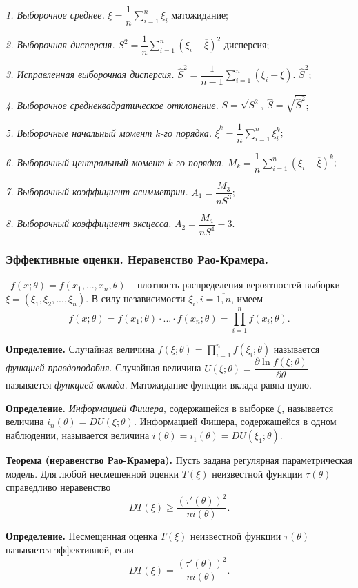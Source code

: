 \documentclass[9pt]{article}
\begin{document}
\ 
\par\textit{1. Выборочное среднее.} \(\overline\xi=\dfrac{1}{n}\displaystyle\sum_{i=1}^n\xi_i\) матожидание;
\par\textit{2. Выборочная дисперсия.} \(S^2=\dfrac{1}{n}\displaystyle\sum_{i=1}^n(\xi_i-\overline\xi)^2\) дисперсия;
\par\textit{3. Исправленная выборочная дисперсия.} \(\hat S^2=\dfrac{1}{n - 1}\displaystyle\sum_{i=1}^n(\xi_i-\overline\xi)\). \(\hat S^2\);
\par\textit{4. Выборочное среднеквадратическое отклонение.} \(S=\sqrt{S^2},\ \hat S=\sqrt{\hat S^2}\);
\par\textit{5. Выборочные начальный момент \(k\)-го порядка.} \(\overline\xi^k=\dfrac{1}{n}\displaystyle\sum_{i=1}^n\xi^k_i\);
\par\textit{6. Выборочный центральный момент \(k\)-го порядка.} \(M_k=\dfrac{1}{n}\displaystyle\sum_{i=1}^n(\xi_i-\overline{\xi})^k\);
\par\textit{7. Выборочный коэффициент асимметрии.} \(A_1=\dfrac{M_3}{nS^3}\);
\par\textit{8. Выборочный коэффициент эксцесса.} \(A_2=\dfrac{M_4}{nS^4}-3\).

\subsubsection{Эффективные оценки. Неравенство Рао-Крамера.}

\ 
 \(f(x;\theta)=f(x_1,...,x_n,\theta)\) -- плотность распределения вероятностей выборки \(\xi=(\xi_1,\xi_2,...,\xi_n)\). В силу независимости \(\xi_i,i=\overline{1,n}\), имеем 
\[f(x;\theta)=f(x_1;\theta)\cdot...\cdot f(x_n;\theta)=\displaystyle\prod_{i=1}^nf(x_i;\theta).\]
\par\textbf{Определение.} Случайная величина \(f(\xi;\theta)=\displaystyle\prod_{i=1}^nf(\xi_i;\theta)\) называется \textit{функцией правдоподобия}. Случайная величина \(U(\xi;\theta)=\dfrac{\partial \ln f(\xi;\theta)}{\partial \theta}\) называется \textit{функцией вклада}. Матожидание функции вклада равна нулю.
\par\textbf{Определение.} \textit{Информацией Фишера}, содержащейся в выборке \(\xi\), называется величина \(i_n(\theta)=DU(\xi;\theta)\). Информацией Фишера, содержащейся в одном наблюдении, называется величина \(i(\theta)=i_1(\theta)=DU(\xi_1;\theta)\).
\par\textbf{Теорема (неравенство Рао-Крамера).} Пусть задана регулярная параметрическая модель. Для любой несмещенной оценки \(T(\xi)\) неизвестной функции \(\tau(\theta)\) справедливо неравенство 
\[DT(\xi)\ge\dfrac{(\tau'(\theta))^2}{ni(\theta)}.\]
\par\textbf{Определение.} Несмещенная оценка \(T(\xi)\) неизвестной функции \(\tau(\theta)\) называется эффективной, если 
\[DT(\xi)=\dfrac{(\tau'(\theta))^2}{ni(\theta)}.\]
\end{document}
